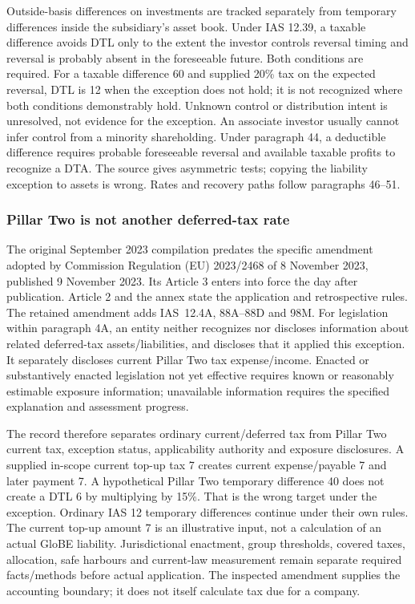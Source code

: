 Outside-basis differences on investments are tracked separately from temporary differences inside the subsidiary's asset book. Under IAS 12.39, a taxable difference avoids DTL only to the extent the investor controls reversal timing and reversal is probably absent in the foreseeable future. Both conditions are required. For a taxable difference 60 and supplied 20\% tax on the expected reversal, DTL is 12 when the exception does not hold; it is not recognized where both conditions demonstrably hold. Unknown control or distribution intent is unresolved, not evidence for the exception. An associate investor usually cannot infer control from a minority shareholding. Under paragraph 44, a deductible difference requires probable foreseeable reversal and available taxable profits to recognize a DTA. The source gives asymmetric tests; copying the liability exception to assets is wrong. Rates and recovery paths follow paragraphs 46--51.

\hypertarget{pillar-two-is-not-another-deferred-tax-rate}{%
\subsubsection{Pillar Two is not another deferred-tax rate}\label{pillar-two-is-not-another-deferred-tax-rate}}

The original September 2023 compilation predates the specific amendment adopted by Commission Regulation (EU) 2023/2468 \citep[arts.~2--3; annex~4A,88A--88D,98M]{eu20232468} of 8 November 2023, published 9 November 2023. Its Article 3 enters into force the day after publication. Article 2 and the annex state the application and retrospective rules. The retained amendment adds IAS~12.4A, 88A--88D and 98M. For legislation within paragraph 4A, an entity neither recognizes nor discloses information about related deferred-tax assets/liabilities, and discloses that it applied this exception. It separately discloses current Pillar Two tax expense/income. Enacted or substantively enacted legislation not yet effective requires known or reasonably estimable exposure information; unavailable information requires the specified explanation and assessment progress.

The record therefore separates ordinary current/deferred tax from Pillar Two current tax, exception status, applicability authority and exposure disclosures. A supplied in-scope current top-up tax 7 creates current expense/payable 7 and later payment 7. A hypothetical Pillar Two temporary difference 40 does not create a DTL 6 by multiplying by 15\%. That is the wrong target under the exception. Ordinary IAS 12 temporary differences continue under their own rules. The current top-up amount 7 is an illustrative input, not a calculation of an actual GloBE liability. Jurisdictional enactment, group thresholds, covered taxes, allocation, safe harbours and current-law measurement remain separate required facts/methods before actual application. The inspected amendment supplies the accounting boundary; it does not itself calculate tax due for a company.
